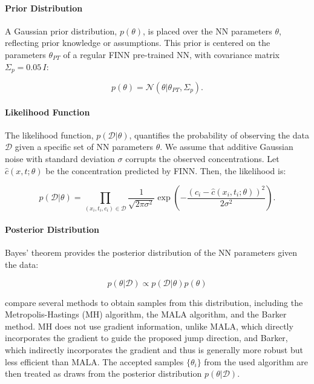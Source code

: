 \paragraph{Prior Distribution}

A Gaussian prior distribution, $p(\theta)$, is placed over the NN parameters $\theta$, reflecting prior knowledge or assumptions. This prior is centered on the parameters $\theta_{PT}$ of a regular FINN pre-trained NN, with covariance matrix $\Sigma_p = 0.05 \, I$:


\begin{equation*}
p(\theta) = \mathcal{N}(\theta | \theta_{PT}, \Sigma_p) .
\end{equation*}

\paragraph{Likelihood Function}

The likelihood function, $p(\mathcal{D} | \theta)$, quantifies the probability of observing the data $\mathcal{D}$ given a specific set of NN parameters $\theta$. We assume that additive Gaussian noise with standard deviation $\sigma$ corrupts the observed concentrations. Let $\hat{c}(x,t;\theta)$ be the concentration predicted by FINN. Then, the likelihood is:

\begin{equation}
p(\mathcal{D} | \theta) = \prod_{(x_i, t_i, c_i) \in \mathcal{D}} \frac{1}{\sqrt{2\pi \sigma^2}} \exp \left( -\frac{(c_i - \hat{c}(x_i,t_i;\theta))^2}{2\sigma^2} \right) .
\label{eq:likelihood}
\end{equation}

\paragraph{Posterior Distribution}

Bayes' theorem provides the posterior distribution of the NN parameters given the data:

\begin{equation*}
p(\theta | \mathcal{D}) \propto p(\mathcal{D} | \theta) p(\theta)
\end{equation*}

\textcite{finn} compare several methods to obtain samples from this distribution, including the Metropolis-Hastings (MH) algorithm, the MALA algorithm, and the Barker method. MH does not use gradient information, unlike MALA, which directly incorporates the gradient to guide the proposed jump direction, and Barker, which indirectly incorporates the gradient and thus is generally more robust but less efficient than MALA.
The accepted samples $\{\theta_i\}$ from the used algorithm are then treated as draws from the posterior distribution $p(\theta | \mathcal{D})$.

